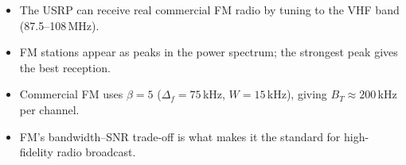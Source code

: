 \documentclass[../../main.tex]{subfiles}
\begin{document}
\begin{SummaryBox}
\begin{itemize}[leftmargin=1.5em]
  \item The USRP can receive real commercial FM radio by tuning to the VHF band (87.5--108\,MHz).
  \item FM stations appear as peaks in the power spectrum; the strongest peak gives the best reception.
  \item Commercial FM uses $\beta = 5$ ($\Delta_f = 75$\,kHz, $W = 15$\,kHz), giving $B_T \approx 200$\,kHz per channel.
  \item FM's bandwidth--SNR trade-off is what makes it the standard for high-fidelity radio broadcast.
\end{itemize}
\end{SummaryBox}

\setcounter{secnumdepth}{2}
\end{document}
